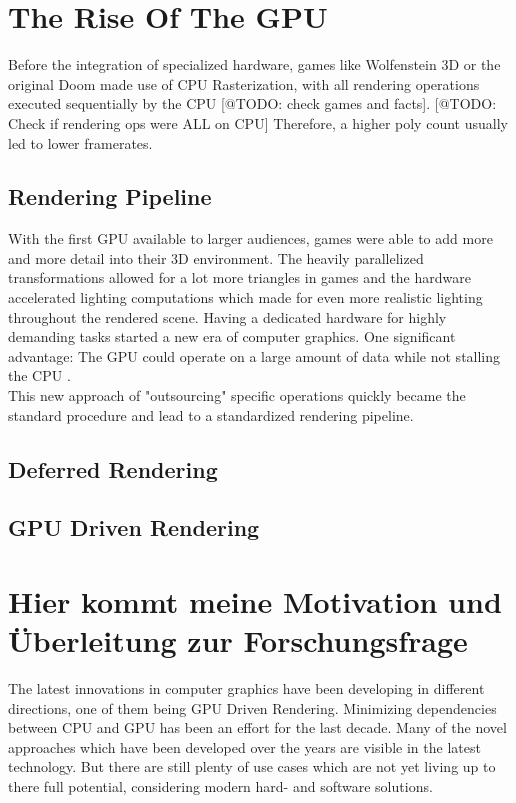 \section{The Rise Of The GPU}

Before the integration of specialized hardware, games like Wolfenstein 3D or the original Doom made use of 
CPU Rasterization, with all rendering operations executed sequentially by the CPU [@TODO: check games and facts].
[@TODO: Check if rendering ops were ALL on CPU]
Therefore, a higher poly count usually led to lower framerates.

\subsection{Rendering Pipeline}

With the first \ac{GPU} available to larger audiences, games were able to add more and more 
detail into their 3D environment. The heavily parallelized transformations allowed for a lot 
more triangles in games and the hardware accelerated lighting computations which made for 
even more realistic lighting throughout the rendered scene. Having a dedicated hardware for 
highly demanding tasks started a new era of computer graphics. One significant advantage: 
The \ac{GPU} could operate on a large amount of data while not stalling the CPU \cite{Fenno2024}.\\

\noindent 
This new approach of "outsourcing" specific operations quickly became the standard procedure and 
lead to a standardized rendering pipeline. 



\subsection{Deferred Rendering}



\subsection{GPU Driven Rendering}


\section{Hier kommt meine Motivation und Überleitung zur Forschungsfrage}

The latest innovations in computer graphics have been developing in different directions,
one of them being GPU Driven Rendering. Minimizing dependencies between \ac{CPU} and \ac{GPU} 
has been an effort for the last decade. Many of the novel approaches which have been developed 
over the years are visible in the latest technology. But there are still plenty of use cases 
which are not yet living up to there full potential, considering modern hard- and software solutions.\\

